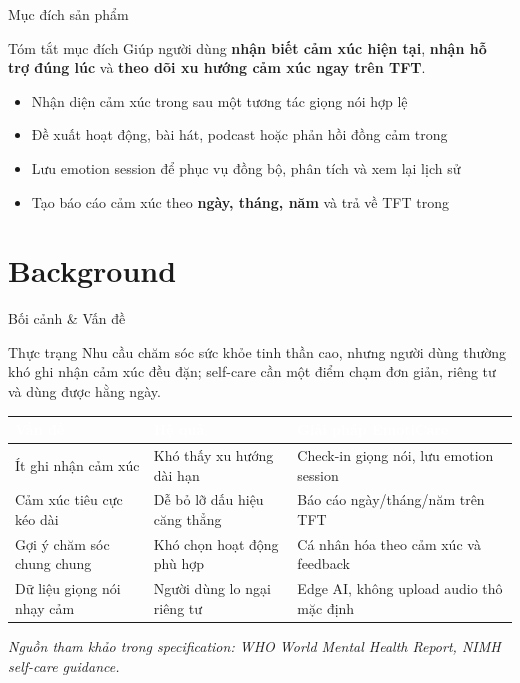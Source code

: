 \documentclass[12pt,aspectratio=169]{beamer}
\renewcommand{\arraystretch}{1.25}
\newcommand{\statpill}[2]{%
  \tikz[baseline=-0.6ex]{
    \node[draw=ecAccent,line width=1pt,rounded corners=6pt,fill=ecAccent!12,
          inner sep=4pt,font=\bfseries\scriptsize,text=ecPrimaryDk] {#1 #2};
  }%
}
\begin{document}
\begin{frame}{Mục đích sản phẩm}
  \small
  \begin{block}{Tóm tắt mục đích}
    Giúp người dùng \textbf{nhận biết cảm xúc hiện tại}, \textbf{nhận hỗ trợ đúng lúc} và \textbf{theo dõi xu hướng cảm xúc ngay trên TFT}.
  \end{block}
  \vspace{0.1cm}
  \begin{itemize}
    \item Nhận diện cảm xúc trong \statpill{15s}{} sau một tương tác giọng nói hợp lệ
    \item Đề xuất hoạt động, bài hát, podcast hoặc phản hồi đồng cảm trong \statpill{20s}{}
    \item Lưu emotion session để phục vụ đồng bộ, phân tích và xem lại lịch sử
    \item Tạo báo cáo cảm xúc theo \textbf{ngày, tháng, năm} và trả về TFT trong \statpill{180s}{}
  \end{itemize}
\end{frame}

\section{Background}

\begin{frame}{Bối cảnh \& Vấn đề}
  \begin{block}{Thực trạng}
    \small Nhu cầu chăm sóc sức khỏe tinh thần cao, nhưng người dùng thường khó ghi nhận cảm xúc đều đặn; self-care cần một điểm chạm đơn giản, riêng tư và dùng được hằng ngày.
  \end{block}
  \vspace{0.05cm}
  {\renewcommand{\arraystretch}{0.96}
  \scriptsize
  \begin{tabularx}{\textwidth}{L{2.9cm}YY}
  \toprule
  \textcolor{white}{\textbf{Vấn đề}} & \textcolor{white}{\textbf{Hệ quả}} & \textcolor{white}{\textbf{Giải pháp EmotiCare}} \\
  \midrule
  Ít ghi nhận cảm xúc & Khó thấy xu hướng dài hạn & Check-in giọng nói, lưu emotion session \\
  Cảm xúc tiêu cực kéo dài & Dễ bỏ lỡ dấu hiệu căng thẳng & Báo cáo ngày/tháng/năm trên TFT \\
  Gợi ý chăm sóc chung chung & Khó chọn hoạt động phù hợp & Cá nhân hóa theo cảm xúc và feedback \\
  Dữ liệu giọng nói nhạy cảm & Người dùng lo ngại riêng tư & Edge AI, không upload audio thô mặc định \\
  \bottomrule
  \end{tabularx}}
  \vspace{0.05cm}
  \centering\scriptsize\color{ecInk!65}\textit{Nguồn tham khảo trong specification: WHO World Mental Health Report, NIMH self-care guidance.}
\end{frame}
\end{document}
